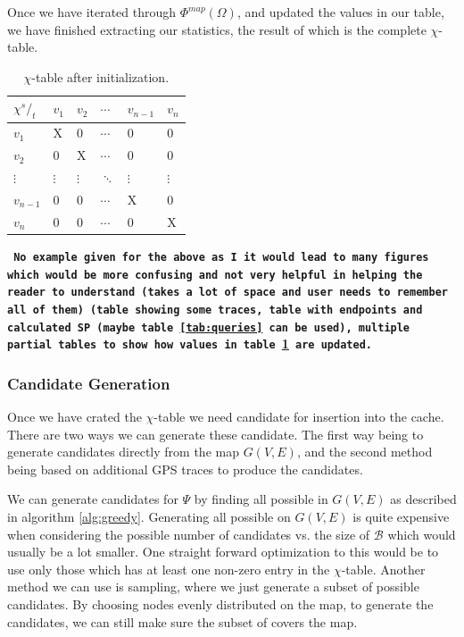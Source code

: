 Once we have iterated through $\Phi^{map}(\Omega)$, and updated the values in our table, we have finished extracting our statistics, the result of which is the complete $\chi$-table.

\begin{table}
\center
\begin{tabular}{|l||l|l|l|l|l|}
\textbf{$\chi {^s/_t}$}	& $v_1$		& $v_2$		& $\cdots$	& $v_{n-1}$	& $v_n$	\\\hline
$v_1$			& X		& 0		& $\cdots$	& 0		& 0	 \\
$v_2$			& 0		& X		& $\cdots$	& 0		& 0	 \\
$\vdots$		& $\vdots$	& $\vdots$	& $\ddots$	& $\vdots$	& $\vdots$ \\
$v_{n-1}$		& 0		& 0		& $\cdots$	& X		& 0	 \\
$v_n$			& 0		& 0		& $\cdots$	& 0		& X	 \\
\end{tabular}
\caption{$\chi$-table after initialization.}
\label{tab:chitable}
\end{table}

\texttt{\textbf{ No example given for the above as I it would lead to many figures which would be more confusing and not very helpful in helping the reader to understand (takes a lot of space and user needs to remember all of them) (table showing some traces, table with endpoints and calculated SP (maybe table \ref{tab:queries} can be used), multiple partial tables to show how values in table \ref{tab:chitable} are updated.}}

\subsubsection{Candidate Generation}

Once we have crated the $\chi$-table we need candidate \spaths for insertion into the cache. There are two ways we can generate these candidate. The first way being to generate candidates directly from the map $G(V,E)$, and the second method being based on additional GPS traces to produce the candidates.

We can generate candidates for $\Psi$ by finding all possible \spath in $G(V,E)$ as described in algorithm \ref{alg:greedy}. Generating all \spath possible on $G(V,E)$ is quite expensive when considering the possible number of candidates vs. the size of $\mathcal{B}$ which would usually be a lot smaller. One straight forward optimization to this would be to use only those \spath which has at least one non-zero entry in the $\chi$-table. Another method we can use is sampling, where we just generate a subset of possible candidates. By choosing nodes evenly distributed on the map, to generate the candidates, we can still make sure the subset of \spaths covers the map.


